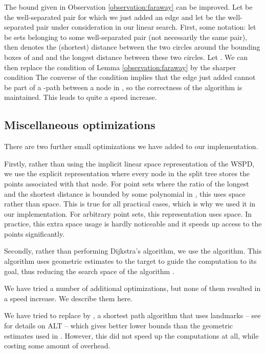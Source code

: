 \documentclass[runningheads,envcountsame,oribibl,orivec]{llncs}
\begin{document}
The bound given in Observation \ref{observation:faraway} can be improved. Let  be the well-separated pair for which we just added an edge and let  be the well-separated pair under consideration in our linear search. First, some notation: let  be sets belonging to some well-separated pair (not necessarily the same pair), then  denotes the (shortest) distance between the two circles around the bounding boxes of  and  and  the longest distance between these two circles. Let . We can then replace the condition of Lemma \ref{observation:faraway} by the sharper condition  The converse of the condition implies that the edge just added cannot be part of a -path between a node in , so the correctness of the algorithm is maintained. This leads to quite a speed increase.

\subsection{Miscellaneous optimizations}

There are two further small optimizations we have added to our implementation.

Firstly, rather than using the implicit linear space representation of the WSPD, we use the explicit representation where every node in the split tree stores the points associated with that node. For point sets where the ratio of the longest and the shortest distance is bounded by some polynomial in , this uses  space rather than  space. This is true for all practical cases, which is why we used it in our implementation. For arbitrary point sets, this representation uses  space. In practice, this extra space usage is hardly noticeable and it speeds up access to the points significantly.

Secondly, rather than performing Dijkstra's algorithm, we use the  algorithm. This algorithm uses geometric estimates to the target to guide the computation to its goal, thus reducing the search space of the algorithm \cite{Goldberg:2005:CSP:1070432.1070455}.

We have tried a number of additional optimizations, but none of them resulted in a speed increase. We describe them here.

We have tried to replace  by , a shortest path algorithm that uses landmarks -- see \cite{Goldberg:2005:CSP:1070432.1070455} for details on ALT -- which gives better lower bounds than the geometric estimates used in . However, this did not speed up the computations at all, while costing some amount of overhead.
\end{document}
